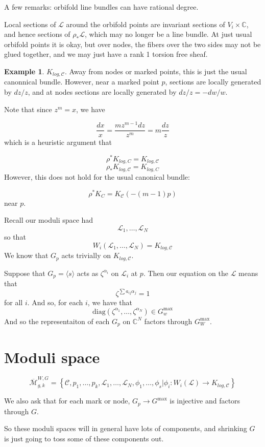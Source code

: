 \documentclass{amsart}
\theoremstyle{definition}
\newtheorem{example}[dummy]{Example}
\newcommand{\Mbar}{\overline{\mathcal{M}}}
\newcommand{\C}{\mathbb{C}}
\begin{document}
A few remarks: orbifold line bundles can have rational degree.

Local sections of $\mathcal{L}$ around the orbifold points are invariant sections of $V_i\times\C$, and hence sections of $\rho_*\mathcal{L}$, which may no longer be a line bundle.  At just usual orbifold points it is okay, but over nodes, the fibers over the two sides may not be glued together, and we may just have a rank 1 torsion free sheaf.

\begin{example}
$K_{log, \mathcal{C}}$.  Away from nodes or marked points, this is just the usual canonnical bundle.  However, near a marked point $p$, sections are locally generated by $dz/z$, and at nodes sections are locally generated by $dz/z=-dw/w$.  
\end{example}
Note that since $z^m=x$, we have

$$\frac{dx}{x}=\frac{mz^{m-1}dz}{z^m}=m\frac{dz}{z}$$
which is a heuristic argument that

$$\rho^* K_{log, C}=K_{log,\mathcal{C}}$$
$$\rho_* K_{log, \mathcal{C}}=K_{log,C}$$
However, this does not hold for the usual canonical bundle:

$$\rho^*K_C=K_{\mathcal{C}}(-(m-1)p)$$ 
near $p$.

 Recall our moduli space had
$$\mathcal{L}_1,\dots, \mathcal{L}_N$$
so that
$$W_i(\mathcal{L}_1,\dots, \mathcal{L}_N)=K_{log,\mathcal{C}}$$
We know that $G_p$ acts trivially on $K_{log,\mathcal{C}}$.

Suppose that $G_p=\langle s \rangle$ acts as $\zeta^{\alpha_i}$ on $\mathcal{L}_i$ at $p$.  Then our equation on the $\mathcal{L}$ means that 
$$\zeta^{\sum a_{ij}\alpha_j}=1$$
for all $i$.
And so, for each $i$, we have that $$\text{diag}(\zeta^{\alpha_1},\dots, \zeta^{\alpha_N})\in G_w^{\max}$$
And so the representaiton of each $G_p$ on $\C^N$ factors through $G_W^{\max}$.

\section{Moduli space}

$$\Mbar_{g,k}^{W,G}=\left\{ \mathcal{C}, p_1,\dots, p_k, \mathcal{L}_1,\dots,\mathcal{L}_N,\phi_1,\dots,\phi_s|\phi_i:W_i(\mathcal{L})\to K_{log, \mathcal{C}}\right\}$$

We also ask that for each mark or node, $G_p\to G^{\max}$ is injective and factors through $G$.

So these moduli spaces will in general have lots of components, and shrinking $G$ is just going to toss some of these components out.
\end{document}
